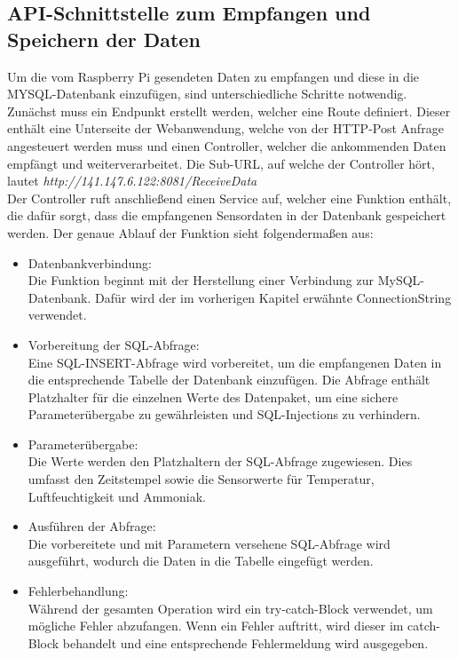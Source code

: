 \documentclass[conference]{IEEEtran}
\begin{document}
\subsection{API-Schnittstelle zum Empfangen und Speichern der Daten}
Um die vom Raspberry Pi gesendeten Daten zu empfangen und diese in die MYSQL-Datenbank einzufügen, sind unterschiedliche Schritte notwendig. Zunächst muss ein Endpunkt erstellt werden, welcher eine Route definiert. Dieser enthält eine Unterseite der Webanwendung, welche von der HTTP-Post Anfrage angesteuert werden muss und einen Controller, welcher die ankommenden Daten empfängt und weiterverarbeitet. Die Sub-URL, auf welche der Controller hört, lautet \textit{http://141.147.6.122:8081/ReceiveData} \\
Der Controller ruft anschließend einen Service auf, welcher eine Funktion enthält, die dafür sorgt, dass die empfangenen Sensordaten in der Datenbank gespeichert werden. Der genaue Ablauf der Funktion sieht folgendermaßen aus:
\begin{itemize}
	\item Datenbankverbindung: \\
	Die Funktion beginnt mit der Herstellung einer Verbindung zur MySQL-Datenbank. Dafür wird der im vorherigen Kapitel erwähnte ConnectionString verwendet.
	\item Vorbereitung der SQL-Abfrage: \\
	Eine SQL-INSERT-Abfrage wird vorbereitet, um die empfangenen Daten in die entsprechende Tabelle der Datenbank einzufügen. Die Abfrage enthält Platzhalter für die einzelnen Werte des Datenpaket, um eine sichere Parameterübergabe zu gewährleisten und SQL-Injections zu verhindern.
	\item Parameterübergabe: \\
	Die Werte werden den Platzhaltern der SQL-Abfrage zugewiesen. Dies umfasst den Zeitstempel sowie die Sensorwerte für Temperatur, Luftfeuchtigkeit und Ammoniak.
	\item Ausführen der Abfrage: \\
	Die vorbereitete und mit Parametern versehene SQL-Abfrage wird ausgeführt, wodurch die Daten in die Tabelle eingefügt werden.
	\item Fehlerbehandlung: \\
	Während der gesamten Operation wird ein try-catch-Block verwendet, um mögliche Fehler abzufangen. Wenn ein Fehler auftritt, wird dieser im catch-Block behandelt und eine entsprechende Fehlermeldung wird ausgegeben.
\end{itemize}
\end{document}

